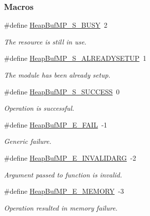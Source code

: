 \subsubsection*{Macros}
\begin{DoxyCompactItemize}
\item 
\#define \hyperlink{_heap_buf_m_p_8h_ae1b0ea5865b0687653171ad2bf3d17b3}{Heap\-Buf\-M\-P\-\_\-\-S\-\_\-\-B\-U\-S\-Y}~2
\begin{DoxyCompactList}\small\item\em The resource is still in use. \end{DoxyCompactList}\item 
\#define \hyperlink{_heap_buf_m_p_8h_a8d7ddf7f2176ffd9e11dad5d32545ebb}{Heap\-Buf\-M\-P\-\_\-\-S\-\_\-\-A\-L\-R\-E\-A\-D\-Y\-S\-E\-T\-U\-P}~1
\begin{DoxyCompactList}\small\item\em The module has been already setup. \end{DoxyCompactList}\item 
\#define \hyperlink{_heap_buf_m_p_8h_ab98593be8c8588e512f38265b4d185f0}{Heap\-Buf\-M\-P\-\_\-\-S\-\_\-\-S\-U\-C\-C\-E\-S\-S}~0
\begin{DoxyCompactList}\small\item\em Operation is successful. \end{DoxyCompactList}\item 
\#define \hyperlink{_heap_buf_m_p_8h_afe559bb52af4c143c559d3ca44654520}{Heap\-Buf\-M\-P\-\_\-\-E\-\_\-\-F\-A\-I\-L}~-\/1
\begin{DoxyCompactList}\small\item\em Generic failure. \end{DoxyCompactList}\item 
\#define \hyperlink{_heap_buf_m_p_8h_a3bd067e1c23ed6c94aad604e5a74244d}{Heap\-Buf\-M\-P\-\_\-\-E\-\_\-\-I\-N\-V\-A\-L\-I\-D\-A\-R\-G}~-\/2
\begin{DoxyCompactList}\small\item\em Argument passed to function is invalid. \end{DoxyCompactList}\item 
\#define \hyperlink{_heap_buf_m_p_8h_a7dff5751dc8d83830b7ad130d0e6fe86}{Heap\-Buf\-M\-P\-\_\-\-E\-\_\-\-M\-E\-M\-O\-R\-Y}~-\/3
\begin{DoxyCompactList}\small\item\em Operation resulted in memory failure. \end{DoxyCompactList}\item 

\end{DoxyCompactItemize}
